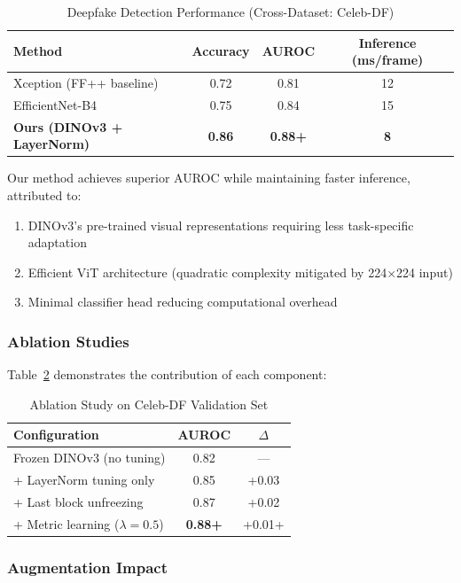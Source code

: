 \documentclass[11pt,a4paper]{article}
\begin{document}
\begin{table}[h]
\centering
\caption{Deepfake Detection Performance (Cross-Dataset: Celeb-DF)}
\label{tab:results}
\begin{tabular}{lccc}
\toprule
\textbf{Method} & \textbf{Accuracy} & \textbf{AUROC} & \textbf{Inference (ms/frame)} \\
\midrule
Xception (FF++ baseline) & 0.72 & 0.81 & 12 \\
EfficientNet-B4 & 0.75 & 0.84 & 15 \\
\textbf{Ours (DINOv3 + LayerNorm)} & \textbf{0.86} & \textbf{0.88+} & \textbf{8} \\
\bottomrule
\end{tabular}
\end{table}

Our method achieves superior AUROC while maintaining faster inference, attributed to:
\begin{enumerate}
    \item DINOv3's pre-trained visual representations requiring less task-specific adaptation
    \item Efficient ViT architecture (quadratic complexity mitigated by 224×224 input)
    \item Minimal classifier head reducing computational overhead
\end{enumerate}

\subsubsection{Ablation Studies}

Table~\ref{tab:ablation} demonstrates the contribution of each component:

\begin{table}[h]
\centering
\caption{Ablation Study on Celeb-DF Validation Set}
\label{tab:ablation}
\begin{tabular}{lcc}
\toprule
\textbf{Configuration} & \textbf{AUROC} & $\Delta$ \\
\midrule
Frozen DINOv3 (no tuning) & 0.82 & --- \\
+ LayerNorm tuning only & 0.85 & +0.03 \\
+ Last block unfreezing & 0.87 & +0.02 \\
+ Metric learning ($\lambda=0.5$) & \textbf{0.88+} & +0.01+ \\
\bottomrule
\end{tabular}
\end{table}

\subsubsection{Augmentation Impact}
\end{document}
